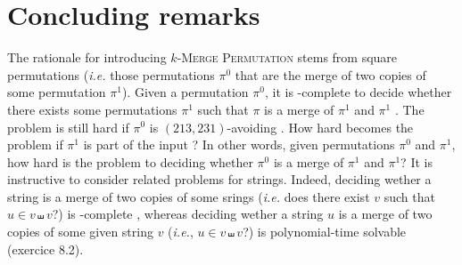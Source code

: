 \section{Concluding remarks}
\label{section:Concluding remarks}

The rationale for introducing \textsc{$k$-Merge Permutation} stems
from square permutations (\emph{i.e.} those permutations $\pi^0$ that are the merge 
of two copies of some permutation $\pi^1$).
Given a permutation $\pi^0$, it is \NP-complete to decide
whether there exists some permutations $\pi^1$ such that
$\pi$ is a merge of $\pi^1$ and $\pi^1$ \cite{DBLP:journals/tcs/GiraudoV18}.
The problem is still hard if $\pi^0$ is $(213,231)$-avoiding \cite{DBLP:journals/tcs/GiraudoV18,DBLP:journals/tcs/BulteauV20}.
How hard becomes the problem if $\pi^1$ is part of the input ?
In other words, given permutations $\pi^0$ and $\pi^1$, how hard is the problem
to deciding whether $\pi^0$ is a merge of $\pi^1$ and $\pi^1$?
It is instructive to consider related problems for strings.
Indeed, deciding wether a string is a merge of two copies of some srings 
(\emph{i.e.} does there exist $v$ such that $u \in v \shuffle v$?) is \NP-complete
\cite{DBLP:journals/jcss/BussS14,RIZZI2017}, whereas
deciding wether a string $u$ is a merge of two copies of some given string $v$ 
(\emph{i.e.}, $u \in v \shuffle v$?) is 
polynomial-time solvable \cite{skienna08} (exercice 8.2).

